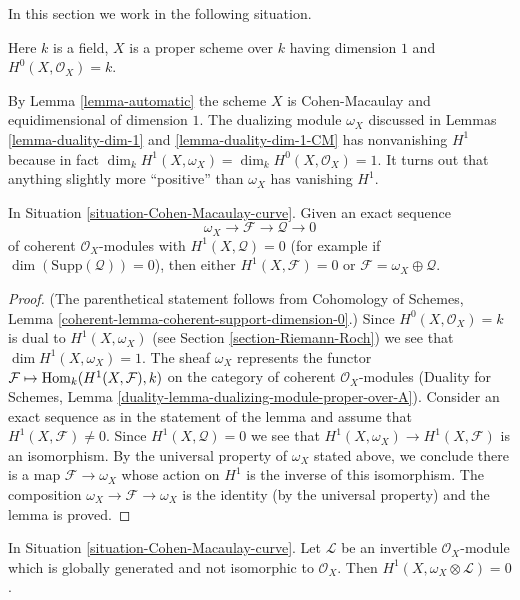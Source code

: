 \noindent
In this section we work in the following situation.

\begin{situation}
\label{situation-Cohen-Macaulay-curve}
Here $k$ is a field, $X$ is a proper scheme over $k$ having dimension $1$
and $H^0(X, \mathcal{O}_X) = k$.
\end{situation}

\noindent
By Lemma \ref{lemma-automatic} the scheme $X$ is Cohen-Macaulay and
equidimensional of dimension $1$. The dualizing module $\omega_X$
discussed in Lemmas \ref{lemma-duality-dim-1} and
\ref{lemma-duality-dim-1-CM} has nonvanishing $H^1$ because in fact
$\dim_k H^1(X, \omega_X) = \dim_k H^0(X, \mathcal{O}_X) = 1$. It turns out
that anything slightly more ``positive'' than $\omega_X$ has vanishing $H^1$.

\begin{lemma}
\label{lemma-vanishing}
In Situation \ref{situation-Cohen-Macaulay-curve}. Given an exact sequence
$$
\omega_X \to \mathcal{F} \to \mathcal{Q} \to 0
$$
of coherent $\mathcal{O}_X$-modules with $H^1(X, \mathcal{Q}) = 0$
(for example if $\dim(\text{Supp}(\mathcal{Q})) = 0$), then
either $H^1(X, \mathcal{F}) = 0$ or
$\mathcal{F} = \omega_X \oplus \mathcal{Q}$.
\end{lemma}

\begin{proof}
(The parenthetical statement follows from
Cohomology of Schemes, Lemma \ref{coherent-lemma-coherent-support-dimension-0}.)
Since $H^0(X, \mathcal{O}_X) = k$ is dual to $H^1(X, \omega_X)$
(see Section \ref{section-Riemann-Roch})
we see that $\dim H^1(X, \omega_X) = 1$. The sheaf $\omega_X$
represents the functor
$\mathcal{F} \mapsto \mathop{\mathrm{Hom}}\nolimits_k(H^1(X, \mathcal{F}), k)$
on the category of coherent $\mathcal{O}_X$-modules
(Duality for Schemes, Lemma
\ref{duality-lemma-dualizing-module-proper-over-A}).
Consider an exact sequence as in the statement of the lemma
and assume that $H^1(X, \mathcal{F}) \not = 0$. Since
$H^1(X, \mathcal{Q}) = 0$ we see that
$H^1(X, \omega_X) \to H^1(X, \mathcal{F})$ is an isomorphism.
By the universal property of $\omega_X$ stated above, we conclude there
is a map $\mathcal{F} \to \omega_X$ whose action on $H^1$ is the inverse
of this isomorphism. The composition $\omega_X \to \mathcal{F} \to \omega_X$
is the identity (by the universal property) and the lemma is proved.
\end{proof}

\begin{lemma}
\label{lemma-vanishing-twist}
In Situation \ref{situation-Cohen-Macaulay-curve}. Let
$\mathcal{L}$ be an invertible $\mathcal{O}_X$-module which is
globally generated and not isomorphic to $\mathcal{O}_X$. Then
$H^1(X, \omega_X \otimes \mathcal{L}) = 0$.
\end{lemma}

